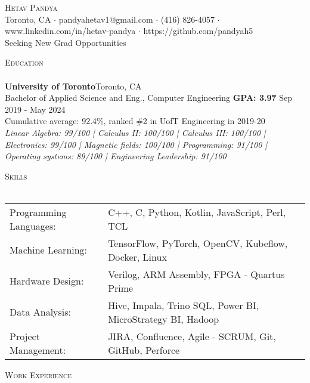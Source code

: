 \documentclass[a4paper]{article}
\newcommand{\lineunder} {
    \vspace*{-8pt} \\
    \hspace*{-18pt} \hrulefill \\
}
\newcommand{\header} [1] {
    {\hspace*{-18pt}\vspace*{6pt} \textsc{#1}}
    \vspace*{-6pt} \lineunder
}
\begin{document}
\vspace*{-40pt}



\vspace*{-10pt}
\begin{center}
	{\Huge \scshape {Hetav Pandya}}\\
	Toronto, CA $\cdot$ pandyahetav1@gmail.com $\cdot$ (416) 826-4057 $\cdot$ www.linkedin.com/in/hetav-pandya $\cdot$ https://github.com/pandyah5\\
    Seeking New Grad Opportunities
\end{center}

\header{Education}
\textbf{University of Toronto}\hfill Toronto, CA\\
Bachelor of Applied Science and Eng., Computer Engineering \textbf{GPA: 3.97} \hfill Sep 2019 - May 2024\\
Cumulative average: 92.4\%, ranked \#2 in UofT Engineering in 2019-20
\linebreak\\
\textit{Linear Algebra: 99/100 | Calculus II: 100/100 | Calculus III: 100/100 | Electronics: 99/100 | 
Magnetic fields: 100/100 | Programming: 91/100 | Operating systems: 89/100 | Engineering Leadership: 91/100}

\vspace{2mm}

\header{Skills}
\begin{tabular}{ l l }
	Programming Languages: & C++, C, Python, Kotlin, JavaScript, Perl, TCL                    \\
	Machine Learning:      & TensorFlow, PyTorch, OpenCV, Kubeflow, Docker, Linux                     \\
    Hardware Design:       & Verilog, ARM Assembly, FPGA - Quartus Prime                             \\
	Data Analysis:         & Hive, Impala, Trino SQL, Power BI, MicroStrategy BI, Hadoop      \\
	Project Management:    & JIRA, Confluence, Agile - SCRUM, Git, GitHub, Perforce           \\                               
\end{tabular}
\vspace{2mm}

\header{Work Experience}
\vspace{1mm}
\end{document}

